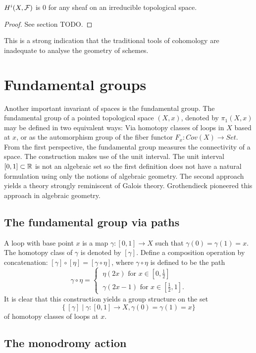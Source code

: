 \begin{proposition}
	$H^i(X, \mathcal{F})$ is 0 for any sheaf on an irreducible topological space.
\end{proposition}
\begin{proof}
	See section TODO.
\end{proof}
This is a strong indication that the traditional tools of cohomology are inadequate to analyse the geometry of schemes.


\section{Fundamental groups}
Another important invariant of spaces is the fundamental group. The fundamental group of a pointed topological space $(X,x)$, denoted by $\pi_1(X,x)$ may be defined in two equivalent ways: Via homotopy classes of loops in $X$ based at $x$, or as the automorphism group of the fiber functor $F_x: Cov(X) \to Set$. From the first perspective, the fundamental group measures the connectivity of a space. The construction makes use of the unit interval. The unit interval $[0,1] \subset \mathbb{R}$ is not an algebraic set so the first definition does not have a natural formulation using only the notions of algebraic geometry. The second approach yields a theory strongly reminiscent of Galois theory. Grothendieck pioneered this approach in algebraic geometry.

\subsection{The fundamental group via paths}
A loop with base point $x$ is a map $\gamma : [0,1] \to X$ such that $\gamma(0) = \gamma(1) = x$. The homotopy class of $\gamma $ is denoted by $[\gamma]$. Define a composition operation by concatenation: $[\gamma] \circ [\eta] = [\gamma \circ \eta]$, where $\gamma \circ \eta$ is defined to be the path
\[
	\gamma \circ \eta =
	\begin{cases}
		\ \eta(2x) \text{ for } x \in [0, \tfrac{1}{2}] \\
		\ \gamma(2x - 1) \text{ for } x \in [\tfrac{1}{2}, 1].
	\end{cases}
\]
It is clear that this construction yields a group structure on the set
\[
	\{\ [\gamma] \mid \gamma : [0,1] \to X , \gamma(0) = \gamma(1) = x \}
\]
of homotopy classes of loops at $x$.

\subsection{The monodromy action}

